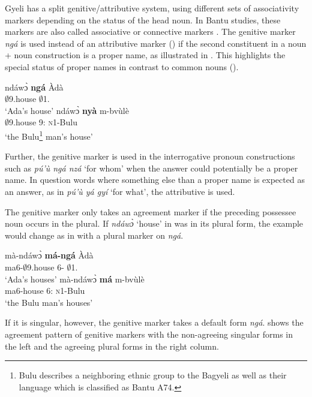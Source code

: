 Gyeli has a split genitive/attributive system, using different sets of associativity markers depending on the status of the head noun. In Bantu studies, these markers are also called associative or connective markers \citep{velde2013}. 
The genitive marker {\itshape ngá} is used instead of an attributive marker () if the second constituent in a noun + noun construction is a proper name, as illustrated in . This highlights the special status of proper names in contrast to common nouns ().

\ea \label{house}
  \ea \label{house1}
 \gll    ndáwɔ̀ {\bfseries ngá} Àdà \\
                $\emptyset$9.house {\GEN} $\emptyset$1.{\PN}\\
    \trans `Ada's house'
\ex \label{house2}
  \gll     ndáwɔ̀ {\bfseries nyà} m-bvùlè \\
                $\emptyset$9.house 9:{\ATT} \textsc{n}1-Bulu \\
    \trans `the Bulu\footnote{Bulu describes a neighboring ethnic group to the Bagyeli as well as their language which is classified as Bantu A74.} man's house'
\z
\z

\noindent Further, the genitive marker is used in the interrogative pronoun constructions such as {\itshape pú'ù ngá nzá} `for whom' when the answer could potentially be a proper name.  In question words where something else than a proper name is expected as an answer, as in {\itshape pú'ù yá gyí} `for what', the attributive is used.

The genitive marker only takes an agreement marker if the preceding possessee noun occurs in the plural. If {\itshape ndáwɔ̀} `house' in  was in its plural form, the example would change as in  with a plural marker on {\itshape ngá}.

\ea \label{housex}
  \ea \label{housex1}
 \gll    mà-ndáwɔ̀ {\bfseries má-ngá} Àdà \\
                ma6-$\emptyset$9.house 6-{\GEN} $\emptyset$1.{\PN}\\
    \trans `Ada's houses'
\ex \label{housex2}
  \gll     mà-ndáwɔ̀ {\bfseries má} m-bvùlè \\
                ma6-house 6:{\ATT} \textsc{n}1-Bulu \\
    \trans `the Bulu man's houses'
\z
\z


\noindent If it is singular, however, the genitive marker takes a default form {\itshape ngá}.  shows the agreement pattern of genitive markers with the non-agreeing singular forms in the left and the agreeing plural forms in the right column.


